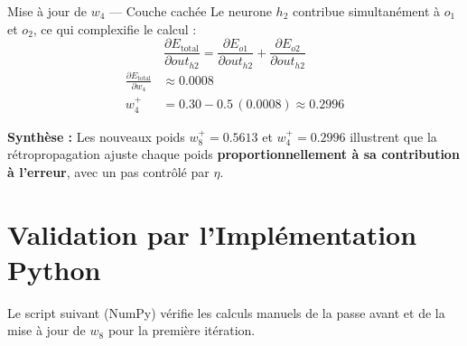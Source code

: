 \documentclass[12pt, a4paper]{article}
\begin{document}
\vspace{0.4cm}

\begin{stepbox}{Mise à jour de $w_4$ — Couche cachée}
Le neurone $h_2$ contribue simultanément à $o_1$ et $o_2$, ce qui complexifie le calcul :
\[
    \frac{\partial E_{\text{total}}}{\partial out_{h2}}
    = \frac{\partial E_{o1}}{\partial out_{h2}}
    + \frac{\partial E_{o2}}{\partial out_{h2}}
\]
\begin{align*}
    \frac{\partial E_{\text{total}}}{\partial w_4}
        &\approx 0.0008 \\[4pt]
    w_4^{+} &= 0.30 - 0.5\,(0.0008) \approx \mathbf{0.2996}
\end{align*}
\end{stepbox}

\begin{resultbox}
\textbf{Synthèse :} Les nouveaux poids $w_8^+ = 0.5613$ et $w_4^+ = 0.2996$
illustrent que la rétropropagation ajuste chaque poids \textbf{proportionnellement
à sa contribution à l'erreur}, avec un pas contrôlé par $\eta$.
\end{resultbox}

\newpage
\section{Validation par l'Implémentation Python}

Le script suivant (NumPy) vérifie les calculs manuels de la passe avant
et de la mise à jour de $w_8$ pour la première itération.
\end{document}
